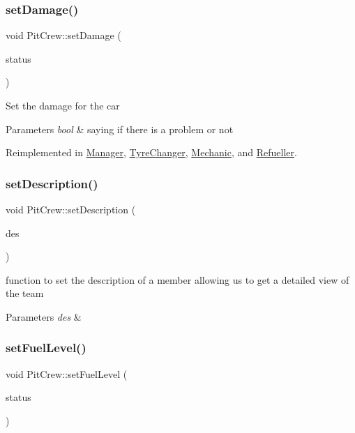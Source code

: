 \subsubsection{\texorpdfstring{set\+Damage()}{setDamage()}}
{\footnotesize\ttfamily void Pit\+Crew\+::set\+Damage (\begin{DoxyParamCaption}\item[{bool}]{status }\end{DoxyParamCaption})\hspace{0.3cm}{\ttfamily [virtual]}}

Set the damage for the car 
\begin{DoxyParams}{Parameters}
{\em bool} & saying if there is a problem or not \\
\hline
\end{DoxyParams}


Reimplemented in \mbox{\hyperlink{class_manager_abb374f168cde17c59609660efff6b186}{Manager}}, \mbox{\hyperlink{class_tyre_changer_ac89db968d57e823330886acbabb65b32}{Tyre\+Changer}}, \mbox{\hyperlink{class_mechanic_a12dfbe444cfcd09925534e2651ef5489}{Mechanic}}, and \mbox{\hyperlink{class_refueller_a0b40ac4e5bd3c83e2a0cfd18214c849d}{Refueller}}.

\mbox{\label{class_pit_crew_a15489fdb826cc62b7d83088ced1e3f8c}} 
\subsubsection{\texorpdfstring{set\+Description()}{setDescription()}}
{\footnotesize\ttfamily void Pit\+Crew\+::set\+Description (\begin{DoxyParamCaption}\item[{string}]{des }\end{DoxyParamCaption})}

function to set the description of a member allowing us to get a detailed view of the team 
\begin{DoxyParams}{Parameters}
{\em des} & \\
\hline
\end{DoxyParams}
\mbox{\label{class_pit_crew_a8c137bb619ab3a331f4f1d7023477e4b}} 
\subsubsection{\texorpdfstring{set\+Fuel\+Level()}{setFuelLevel()}}
{\footnotesize\ttfamily void Pit\+Crew\+::set\+Fuel\+Level (\begin{DoxyParamCaption}\item[{bool}]{status }\end{DoxyParamCaption})\hspace{0.3cm}{\ttfamily [virtual]}}

